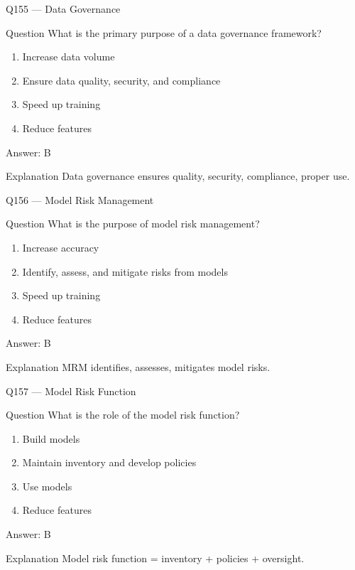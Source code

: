 \documentclass[aspectratio=169,8pt]{beamer}
\begin{document}
	\begin{frame}{Q155 --- Data Governance}
		\begin{block}{Question}
			What is the primary purpose of a data governance framework?
		\end{block}
		\begin{enumerate}
			\item Increase data volume
			\item Ensure data quality, security, and compliance
			\item Speed up training
			\item Reduce features
		\end{enumerate}
		\begin{exampleblock}{Answer: B}\end{exampleblock}
		\begin{block}{Explanation}
			Data governance ensures quality, security, compliance, proper use.
		\end{block}
	\end{frame}
	
	\begin{frame}{Q156 --- Model Risk Management}
		\begin{block}{Question}
			What is the purpose of model risk management?
		\end{block}
		\begin{enumerate}
			\item Increase accuracy
			\item Identify, assess, and mitigate risks from models
			\item Speed up training
			\item Reduce features
		\end{enumerate}
		\begin{exampleblock}{Answer: B}\end{exampleblock}
		\begin{block}{Explanation}
			MRM identifies, assesses, mitigates model risks.
		\end{block}
	\end{frame}
	
	\begin{frame}{Q157 --- Model Risk Function}
		\begin{block}{Question}
			What is the role of the model risk function?
		\end{block}
		\begin{enumerate}
			\item Build models
			\item Maintain inventory and develop policies
			\item Use models
			\item Reduce features
		\end{enumerate}
		\begin{exampleblock}{Answer: B}\end{exampleblock}
		\begin{block}{Explanation}
			Model risk function = inventory + policies + oversight.
		\end{block}
	\end{frame}
	
\end{document}

